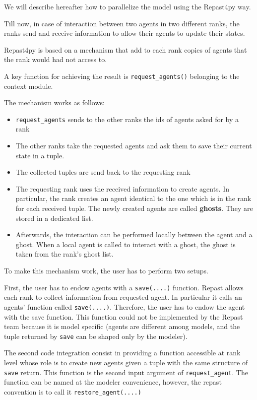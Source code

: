\documentclass{article}
\providecommand{\tightlist}{%
  \setlength{\itemsep}{0pt}\setlength{\parskip}{0pt}}
\begin{document}
We will describe hereafter how to parallelize the model using the Repast4py way.

Till now, in case of interaction between two agents in two different ranks, the ranks send and receive information to allow their agents to update their states.

Repast4py is based on a mechanism that add to each rank copies of agents that the rank would had not access to.

A key function for achieving the result is \verb+request_agents()+ belonging to the context module.

The mechanism works as follows:

\begin{itemize}
	\tightlist
	\item 
\verb+request_agents+ sends to the other ranks the ids of agents asked for by a rank
	\item 
The other ranks take the requested agents and ask them to save their current state in a tuple.
	\item 
The collected tuples are send back to the requesting rank
	\item 
		The requesting rank uses the received information to create agents. In particular, the rank creates an agent identical to the one which is in the rank for each received tuple. The newly created agents are called \textbf{ghosts}. They are stored in a dedicated list.
	\item 
		Afterwards, the interaction can be performed locally between the agent and a ghost. When a local agent is called to interact with a ghost, the ghost is taken from the rank's ghost list.
\end{itemize}

To make this mechanism work, the user has to perform two setups.

First, the user has to endow agents with a \verb+save(....)+ function.
Repast allows each rank to collect information from requested agent. In particular it calls an agents' function called \verb+save(....)+.
Therefore, the user has to endow the agent with the save function. This function could not be implemented by the Repast team because it is model specific (agents are different among models, and the tuple returned by \verb+save+ can be shaped only by the modeler).

The second code integration consist in providing a function accessible at rank level whose role is to create new agents given a tuple with the same structure of \verb+save+ return. This function is the second input argument of \verb+request_agent+. The function can be named at the modeler convenience, however, the repast convention is to call it \verb+restore_agent(....)+   
\end{document}
